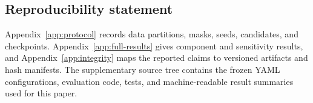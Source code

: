 \documentclass{article}
\begin{document}
\subsection*{Reproducibility statement}
Appendix~\ref{app:protocol} records data partitions, masks, seeds, candidates, and checkpoints. Appendix~\ref{app:full-results} gives component and sensitivity results, and Appendix~\ref{app:integrity} maps the reported claims to versioned artifacts and hash manifests. The supplementary source tree contains the frozen YAML configurations, evaluation code, tests, and machine-readable result summaries used for this paper.




\appendix

\end{document}
